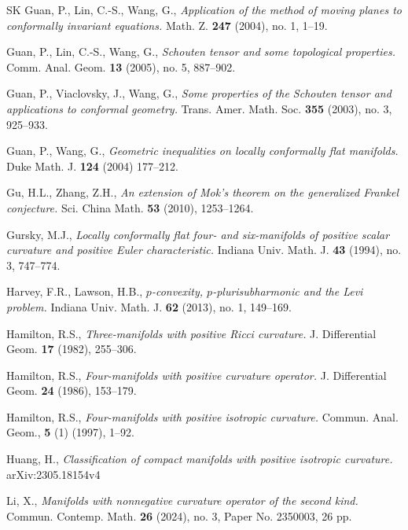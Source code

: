 \documentclass[12pt, twoside]{article}
\theoremstyle{definition}
\numberwithin{equation}{section}
\begin{document}
\begin{thebibliography}{SK}
Guan, P.,  Lin, C.-S., Wang, G.,
\textit{Application of the method of moving planes to conformally invariant equations.}
Math. Z. \textbf{247} (2004), no. 1, 1--19. 

Guan, P.,  Lin, C.-S., Wang, G.,
\textit{Schouten tensor and some topological properties.}
Comm. Anal. Geom. \textbf{13} (2005), no. 5, 887--902.

Guan, P., Viaclovsky, J., Wang, G.,
\textit{Some properties of the Schouten tensor and applications to conformal geometry.}
Trans. Amer. Math. Soc. \textbf{355} (2003), no. 3, 925--933. 

Guan, P., Wang, G.,
\textit{Geometric inequalities on locally conformally flat manifolds.} Duke Math. J. \textbf{124} (2004) 177--212.


Gu, H.L., Zhang, Z.H.,
\textit{ An extension of Mok's theorem on the generalized Frankel conjecture.} 
Sci. China Math. \textbf{53} (2010), 1253--1264.

Gursky, M.J.,
\textit{Locally conformally flat four- and six-manifolds of positive scalar curvature and positive Euler characteristic.}
Indiana Univ. Math. J. \textbf{43} (1994), no. 3, 747--774.

Harvey, F.R., Lawson, H.B.,
\textit{ $p$-convexity, $p$-plurisubharmonic and the Levi problem.} Indiana Univ. Math. J. \textbf{62} (2013), no. 1, 149--169.

Hamilton, R.S., 
\textit{Three-manifolds with positive Ricci curvature.}
J. Differential Geom. \textbf{17} (1982), 255--306. 

Hamilton, R.S., 
\textit{Four-manifolds with positive curvature operator.}
J. Differential Geom. \textbf{24} (1986), 153--179.

Hamilton, R.S., 
\textit{ Four-manifolds with positive isotropic curvature.}
Commun. Anal. Geom., \textbf{5} (1) (1997), 1--92.

Huang, H.,  
\textit{Classification of compact manifolds with positive isotropic curvature.}
arXiv:2305.18154v4




Li, X.,
\textit{Manifolds with nonnegative curvature operator of the second kind.}
Commun. Contemp. Math. \textbf{26} (2024), no. 3, Paper No. 2350003, 26 pp.


\end{thebibliography}
\end{document}
